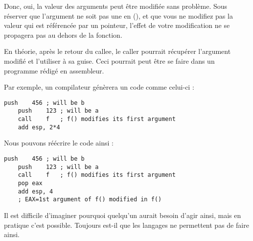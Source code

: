 


Donc, oui, la valeur des arguments peut être modifiée sans problème.
Sous réserver que l'argument ne soit pas une  en \Cpp{} (),
et que vous ne modifiez pas la valeur qui est référencée par un pointeur, l'effet de votre modification 
ne se propagera pas au dehors de la fonction.

En théorie, après le retour du \gls{callee}, le \gls{caller} pourrait récupérer l'argument modifié et 
l'utiliser à sa guise.
Ceci pourrait peut être se faire dans un programme rédigé en assembleur.

Par exemple, un compilateur \CCpp génèrera un code comme celui-ci :

\begin{lstlisting}[style=customasmx86]
	push	456	; will be b
	push	123	; will be a
	call	f	; f() modifies its first argument
	add	esp, 2*4
\end{lstlisting}

Nous pouvons réécrire le code ainsi :

\begin{lstlisting}[style=customasmx86]
	push	456	; will be b
	push	123	; will be a
	call	f	; f() modifies its first argument
	pop	eax
	add	esp, 4
	; EAX=1st argument of f() modified in f()
\end{lstlisting}

Il est difficile d'imaginer pourquoi quelqu'un aurait besoin d'agir ainsi, mais en pratique 
c'est possible.
Toujours est-il que les langages \CCpp ne permettent pas de faire ainsi.



